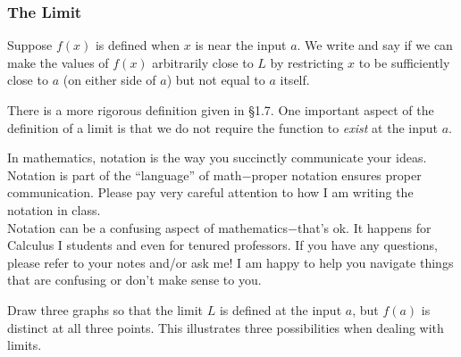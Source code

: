 \documentclass[notes]{subfiles}
\begin{document}
	\subsubsection*{The Limit}
		\begin{defn}
			Suppose $f(x)$ is defined when $x$ is near the input $a$.  We write
			and say
			if we can make the values of $f(x)$ arbitrarily close to $L$ by restricting $x$ to be sufficiently close to $a$ (on either side of $a$) but not equal to $a$ itself.
		\end{defn}
			
		There is a more rigorous definition given in \S1.7.  One important aspect of the definition of a limit is that we do not require the function to \emph{exist} at the input $a$.  
			\newpage
		\begin{rmk}
			In mathematics, notation is the way you succinctly communicate your ideas.  Notation is part of the ``language'' of math$-$proper notation ensures proper communication.  Please pay very careful attention to how I am writing the notation in class.  \\
			Notation can be a confusing aspect of mathematics$-$that's ok.  It happens for Calculus I students and even for tenured professors.  If you have any questions, please refer to your notes and/or ask me!  I am happy to help you navigate things that are confusing or don't make sense to you.
		\end{rmk}
		\begin{ex}
			Draw three graphs so that the limit $L$ is defined at the input $a$, but $f(a)$ is distinct at all three points.  This illustrates three possibilities when dealing with limits.
		\end{ex}
			
\end{document}
